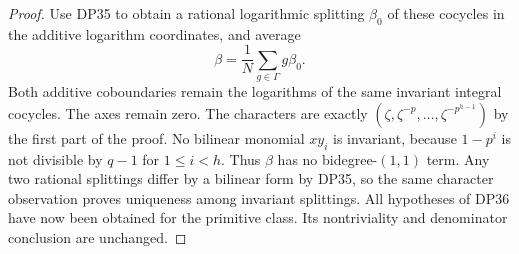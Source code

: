 \begin{proof}
Use DP35 to obtain a rational logarithmic splitting $\beta_0$ of these cocycles in the additive logarithm coordinates, and average
\[
 \beta=\frac1N\sum_{g\in\Gamma}g\beta_0.
\]
Both additive coboundaries remain the logarithms of the same invariant integral cocycles. The axes remain zero. The characters are exactly $(\zeta,\zeta^{-p},\ldots,\zeta^{-p^{h-1}})$ by the first part of the proof. No bilinear monomial $xy_i$ is invariant, because $1-p^i$ is not divisible by $q-1$ for $1\le i<h$. Thus $\beta$ has no bidegree-$(1,1)$ term. Any two rational splittings differ by a bilinear form by DP35, so the same character observation proves uniqueness among invariant splittings. All hypotheses of DP36 have now been obtained for the primitive class. Its nontriviality and denominator conclusion are unchanged.
\end{proof}
